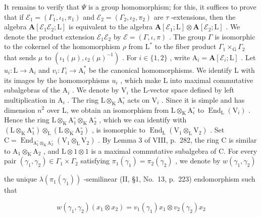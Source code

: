 It remains to verify that \(\Psi\) is a group homomorphism; for this, it suffices to prove that if \(\mathcal{E}_1 = (\Gamma_1,\iota_1,\pi_1)\) and \(\mathcal{E}_2 = (\Gamma_2,\iota_2,\pi_2)\) are \(\tau\) -extensions, then the algebra \(\mathbf{A}[\mathcal{E}_1\mathcal{E}_2;\mathrm{L}]\) is equivalent to the algebra \(\mathbf{A}[\mathcal{E}_1;\mathrm{L}]\otimes \mathbf{A}[\mathcal{E}_2;\mathrm{L}]\) . We denote the product extension \(\mathcal{E}_1\mathcal{E}_2\) by \(\mathcal{E} = (\Gamma ,\iota ,\pi)\) . The group \(\Gamma\) is isomorphic to the cokernel of the homomorphism \(\rho\) from \(\mathrm{L}^*\) to the fiber product \(\Gamma_1\times_{\mathrm{G}}\Gamma_2\) that sends \(\mu\) to \((\iota_1(\mu),\iota_2(\mu)^{-1})\) . For \(i\in \{1,2\}\) , write \(\mathrm{A}_i = \mathbf{A}[\mathcal{E}_i;\mathrm{L}]\) . Let \(u_{i}:\mathrm{L}\to \mathrm{A}_{i}\) and \(v_{i}:\Gamma_{i}\rightarrow \mathrm{A}_{i}^{*}\) be the canonical homomorphisms. We identify L with its images by the homomorphisms \(u_{i}\) , which make L into maximal commutative subalgebras of the \(\mathrm{A}_i\) . We denote by \(\mathrm{V}_i\) the L-vector space defined by left multiplication in \(\mathrm{A}_i\) . The ring \(\mathrm{L}\otimes_{\mathrm{K}}\mathrm{A}_i^{\circ}\) acts on \(\mathrm{V}_i\) . Since it is simple and has dimension \(n^2\) over L, we obtain an isomorphism from \(\mathrm{L}\otimes_{\mathrm{K}}\mathrm{A}_i^{\circ}\) to \(\operatorname {End}_{\mathrm{L}}(\mathrm{V}_{i})\) . Hence the ring \(\mathrm{L}\otimes_{\mathrm{K}}\mathrm{A}_1^{\circ}\otimes_{\mathrm{K}}\mathrm{A}_2^{\circ}\) , which we can identify with \((\mathrm{L}\otimes_{\mathrm{K}}\mathrm{A}_1^{\circ})\otimes_{\mathrm{L}}(\mathrm{L}\otimes_{\mathrm{K}}\mathrm{A}_2^{\circ})\) , is isomorphic to \(\operatorname {End}_{\mathrm{L}}(\mathrm{V}_{1}\otimes_{\mathrm{L}}\mathrm{V}_{2})\) . Set \(\mathrm{C} = \operatorname {End}_{\mathrm{A}_1^{\circ}\otimes_{\mathrm{K}}\mathrm{A}_2^{\circ}}(\mathrm{V}_1\otimes_\mathrm{L}\mathrm{V}_2)\) . By Lemma 3 of VIII, p.~282, the ring C is similar to \(\mathrm{A}_1\otimes_{\mathrm{K}}\mathrm{A}_2\) , and \(\mathrm{L}\otimes 1\otimes 1\) is a maximal commutative subalgebra of C. For every pair \((\gamma_{1},\gamma_{2})\in \Gamma_{1}\times \Gamma_{2}\) satisfying \(\pi_1(\gamma_1) = \pi_2(\gamma_2)\) , we denote by \(w(\gamma_1,\gamma_2)\)

the unique \(\lambda (\pi_1(\gamma_1))\) -semilinear (II, §1, No.~13, p.~223) endomorphism such that

\[
w (\gamma_ {1}, \gamma_ {2}) (x _ {1} \otimes x _ {2}) = v _ {1} (\gamma_ {1}) x _ {1} \otimes v _ {2} (\gamma_ {2}) x _ {2}
\]

